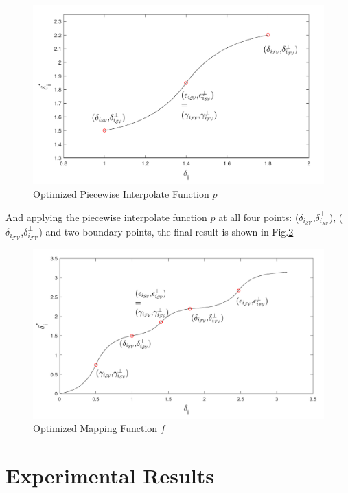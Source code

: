 \begin{figure}[t]
\centering
\includegraphics[scale=.7]{Fig/optimized_single_f.pdf}
\caption{Optimized Piecewise Interpolate Function $p$}
\label{fig:optimized_p}
\end{figure}

And applying the piecewise interpolate function $p$ at all four points: ($\delta_{i_{{\mathcal{SV}}}}$,$\delta^{\perp}_{i_{{\mathcal{SV}}}}$), ($\delta_{i_{{\mathcal{FV}}}}$,$\delta^{\perp}_{i_{{\mathcal{FV}}}}$) and two boundary points, the final result is shown in Fig.\ref{fig:optimized_map}

\begin{figure}[t]
\centering
\includegraphics[scale=.7]{Fig/optimized_mapping_f.pdf}
\caption{Optimized Mapping Function $f$}
\label{fig:optimized_map}
\end{figure}

\section{Experimental Results}\label{sec:result_spatial}

